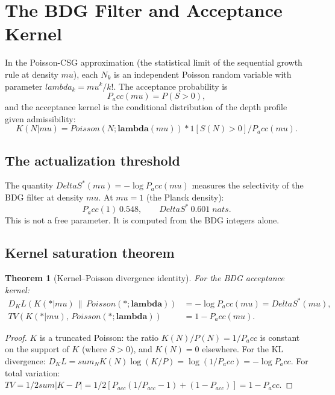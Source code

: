 \documentclass[11pt]{article}
\def\Delta{Delta}%
\def\mu{mu}%
\def\lambda{lambda}%
\def\mathrm#1{#1}%
\def\mathbf#1{#1}%
\def\mathbb#1{#1}%
\def\frac#1#2{#1/#2}%
\def\cdot{*}%
\def\approx{~}%
\def\sum{sum}%
\def\Pacc{P_acc}%
\def\Dkl{D_KL}%
\def\TV{TV}%
\newtheorem{theorem}{Theorem}
\newcommand{\Pacc}{P_{\mathrm{acc}}}
\newcommand{\Dkl}{D_{\mathrm{KL}}}
\newcommand{\TV}{\mathrm{TV}}
\begin{document}
\section{The BDG Filter and Acceptance Kernel}
\label{sec:filter}

In the Poisson-CSG approximation (the statistical limit of the sequential growth rule at density $\mu$), each $N_k$ is an independent Poisson random variable with parameter $\lambda_k=\mu^k/k!$. The acceptance probability is
\begin{equation}
\Pacc(\mu)=\mathbb{P}(S>0),
\end{equation}
and the acceptance kernel is the conditional distribution of the depth profile given admissibility:
\begin{equation}
K(\mathbf{N}|\mu)=\frac{\mathrm{Poisson}(\mathbf{N};\boldsymbol{\lambda}(\mu))\cdot\mathbf{1}[S(\mathbf{N})>0]}{\Pacc(\mu)}.
\end{equation}

\subsection{The actualization threshold}

The quantity $\Delta S^*(\mu)=-\log\Pacc(\mu)$ measures the selectivity of the BDG filter at density $\mu$. At $\mu=1$ (the Planck density):
\begin{equation}
\Pacc(1)\approx 0.548, \qquad \Delta S^* \approx 0.601 \;\mathrm{nats}.
\end{equation}
This is not a free parameter. It is computed from the BDG integers alone.

\subsection{Kernel saturation theorem}

\begin{theorem}[Kernel--Poisson divergence identity]
\label{thm:kl}
For the BDG acceptance kernel:
\begin{align}
\Dkl(K(\cdot|\mu)\,\|\,\mathrm{Poisson}(\cdot;\boldsymbol{\lambda})) &= -\log\Pacc(\mu) = \Delta S^*(\mu), \label{eq:kl}\\
\TV(K(\cdot|\mu),\,\mathrm{Poisson}(\cdot;\boldsymbol{\lambda})) &= 1-\Pacc(\mu). \label{eq:tv}
\end{align}
\end{theorem}
\begin{proof}
$K$ is a truncated Poisson: the ratio $K(\mathbf{N})/P(\mathbf{N})=1/\Pacc$ is constant on the support of $K$ (where $S>0$), and $K(\mathbf{N})=0$ elsewhere. For the KL divergence: $\Dkl=\sum_{\mathbf{N}} K(\mathbf{N})\log(K/P)=\log(1/\Pacc)=-\log\Pacc$. For total variation: $\TV=\frac{1}{2}\sum|K-P|=\frac{1}{2}[P_{\mathrm{acc}}(1/P_{\mathrm{acc}}-1)+(1-P_{\mathrm{acc}})]=1-\Pacc$.
\end{proof}
\end{document}
